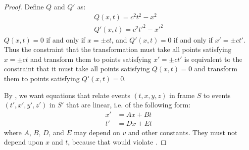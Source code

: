 \documentclass[a4paper]{article}
\theoremstyle{plain}
\theoremstyle{definition}
\begin{document}
\begin{proof}
Define $Q$ and $Q'$ as:
\begin{align}
Q(x,t) = c^2 t^2 - x^2 \label{eqn:defnq} \\
Q'(x,t) = c^2 t'^2 - x'^2 \label{eqn:defnqprime}
\end{align}
$Q(x,t)=0$ if and only if $x = \pm ct$, and
$Q'(x,t)=0$ if and only if $x' = \pm ct'$.
Thus the constraint that the transformation must take all points
satisfying $x = \pm ct$ and transform them to points satisfying $x' =
\pm ct'$ is equivalent to the constraint that it must take all points
satisfying $Q(x,t)=0$ and transform them to points satisfying
$Q'(x,t)=0$.

By \linearity, we want equations that relate events $(t, x, y, z)$ in
frame $S$ to events $(t', x', y', z')$ in $S'$ that are linear,
i.e. of the following form:
\begin{align}
x' & = Ax + Bt \label{eqn:defnxprime} \\
t' & = Dx + Et \label{eqn:defntprime}
\end{align}
where $A$, $B$, $D$, and $E$ may depend on $v$ and other constants.
They must not depend upon $x$ and $t$, because that would violate
\homogeneity.


\end{proof}
\end{document}
